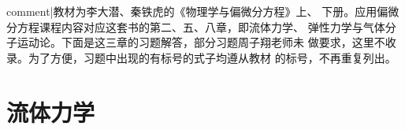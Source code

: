 {{comment|教材为李大潜、秦铁虎的《物理学与偏微分方程》上、
下册。应用偏微分方程课程内容对应这套书的第二、五、八章，即流体力学、
弹性力学与气体分子运动论。下面是这三章的习题解答，部分习题周子翔老师未
做要求，这里不收录。为了方便，习题中出现的有标号的式子均遵从教材
的标号，不再重复列出。}}
\section{流体力学}

